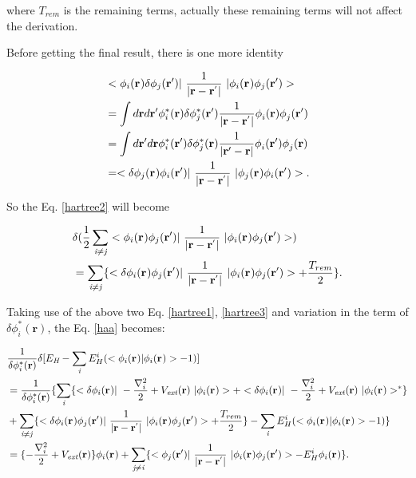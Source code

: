 \documentclass[a4paper, 12pt, titlepage,oneside,drop]{kthesis}
\begin{document}
where $T_{rem}$ is the remaining terms, actually these remaining terms will not affect the derivation.

Before getting the final result, there is one more identity 

\begin{equation}\begin{split}\label{hartreelabel1}
& < \bwf<i><> \delta \bwfn<j><'>|\ \frac{1}{|\textbf{r} - \textbf{r}^{'} |} \ | \bwf<i><> \bwfn<j><'>> \\
& = \int d \textbf{r} d \textbf{r}{'}  \phi_{i}^{*} (\textbf{r}{}) \delta \phi_{j}^{*} (\textbf{r}{'}) \frac{1}{|\textbf{r} - \textbf{r}^{'} |}  \phi_{i}^{} (\textbf{r}{})  \phi_{j}^{} (\textbf{r}{'})\\
& = \int d \textbf{r}{'} d \textbf{r}  \phi_{i}^{*} (\textbf{r}{'}) \delta \phi_{j}^{*} (\textbf{r}{}) \frac{1}{|\textbf{r}{'} - \textbf{r} |}  \phi_{i}^{} (\textbf{r}{'})  \phi_{j}^{} (\textbf{r})\\
& = <\delta \bwf<j><> \bwfn<i><'>|\ \frac{1}{|\textbf{r} - \textbf{r}^{'} |} \ | \bwf<j><> \bwfn<i><'>>.
\end{split}\end{equation}

\noindent So the Eq. \ref{hartree2} will become 

\begin{equation}\begin{split}\label{hartree3}
&  \delta( \frac{1}{2} \suminj<i><j> <\bwf<i><> \bwfn<j><'>|\ \frac{1}{|\textbf{r} - \textbf{r}^{'} |} \ | \bwf<i><> \bwfn<j><'>>)   \\
& =  \suminj<i><j> \{  <\delta \bwf<i><> \bwfn<j><'>|\ \frac{1}{|\textbf{r} - \textbf{r}^{'} |} \ | \bwf<i><> \bwfn<j><'>> + \frac{T_{rem}}{2}\}.
\end{split}\end{equation}


Taking use of the above two Eq. \ref{hartree1}, \ref{hartree3} and variation in the term of  $\delta \phi^{*}_{i}(\textbf{r}{}) $, the Eq. \ref{haa} becomes:

\begin{equation}
\begin{split}\label{hha}
& \frac{1}{\delta  \phi^{*}_{i}(\textbf{r}{})} \delta [ E_{\textit{H}} - \sumi<i> E^{i}_{H} (<\bwf<i><> | \bwf<i><> > -1)] \\
&  = \frac{1}{\delta  \phi^{*}_{i}(\textbf{r}{})} \{ \sumi<i> \{ < \delta \bwf<i><> |\ -\frac{\nabla^{2}_{i}}{2} + V_\textit{ext}(\textbf{r})  \ | \bwf<i><> > + <  \delta \bwf<i><> |\ -\frac{\nabla^{2}_{i}}{2} + V_\textit{ext}(\textbf{r})  \ |  \bwf<i><> >^{\ast} \} \\
& +  \suminj<i><j> \{  <\delta \bwf<i><> \bwfn<j><'>|\ \frac{1}{|\textbf{r} - \textbf{r}^{'} |} \ | \bwf<i><> \bwfn<j><'>> + \frac{T_{rem}}{2}\} - \sumi<i> E^{i}_{H} (<\bwf<i><> | \bwf<i><> > -1) \} \\
& =  { \{-\frac{\nabla^{2}_{i}}{2} + V_\textit{ext}(\textbf{r})} \}  \bwf<i><> +  \suminj<j><i> \{  <\bwfn<j><'>|\ \frac{1}{|\textbf{r} - \textbf{r}^{'} |} \ | \bwf<i><> \bwfn<j><'>> - E^{i}_{H}  \bwf<i><>  \}.
\end{split}
\end{equation}
\end{document}
